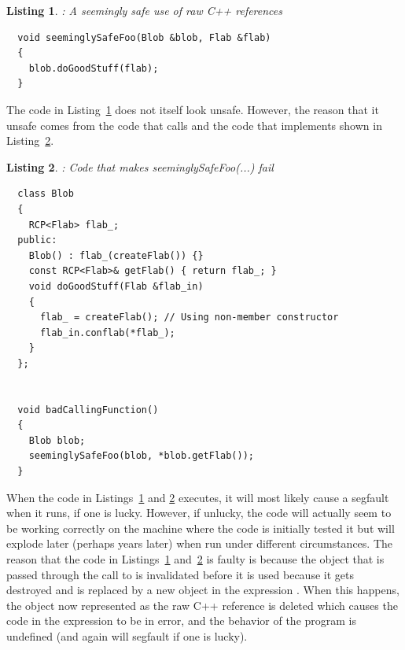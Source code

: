 \documentclass[pdf,ps2pdf,11pt]{SANDreport}
\newtheorem{listing}{Listing}
\begin{document}
{}\begin{listing}: A seemingly safe use of raw C++ references
\label{listing:unsafe_raw_C++_reference1}
{\small\begin{verbatim}
  void seeminglySafeFoo(Blob &blob, Flab &flab)
  {
    blob.doGoodStuff(flab);
  }
\end{verbatim}}
\end{listing}


The code in Listing~\ref{listing:unsafe_raw_C++_reference1} does not
itself look unsafe.  However, the reason that it unsafe comes from the
code that calls {} and the code that
implements {} shown in Listing~\ref{listing:unsafe_raw_C++_reference2}.


{}\begin{listing}: Code that makes seeminglySafeFoo(...) fail
\label{listing:unsafe_raw_C++_reference2}
{\small\begin{verbatim}
  class Blob
  {
    RCP<Flab> flab_;
  public:
    Blob() : flab_(createFlab()) {}
    const RCP<Flab>& getFlab() { return flab_; }
    void doGoodStuff(Flab &flab_in)
    {
      flab_ = createFlab(); // Using non-member constructor
      flab_in.conflab(*flab_);
    }
  };


  void badCallingFunction()
  {
    Blob blob;
    seeminglySafeFoo(blob, *blob.getFlab());
  }
\end{verbatim}}
\end{listing}


When the code in Listings~\ref{listing:unsafe_raw_C++_reference1} and
{}\ref{listing:unsafe_raw_C++_reference2} executes, it will most
likely cause a segfault when it runs, if one is lucky.  However, if
unlucky, the code will actually seem to be working correctly on the
machine where the code is initially tested it but will explode later
(perhaps years later) when run under different circumstances.  The
reason that the code in
Listings~\ref{listing:unsafe_raw_C++_reference1}
and~\ref{listing:unsafe_raw_C++_reference2} is faulty is because the
{} object that is passed through the call
{} to
{} is invalidated before it is used
because it gets destroyed and is replaced by a new object in the
expression {}.  When this happens, the
object now represented as the raw C++ reference {} is
deleted which causes the code in the expression
{} to be in error, and the behavior of
the program is undefined (and again will segfault if one is lucky).
\end{document}
